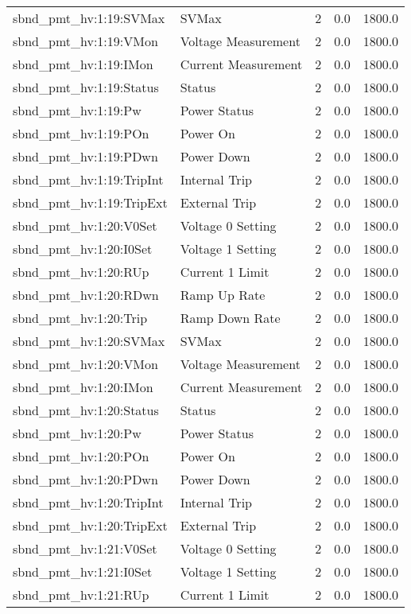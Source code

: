 \begin{center}
\begin{longtable}{l | l l l l }
sbnd\_pmt\_hv:1:19:SVMax & SVMax & 2 & 0.0 & 1800.0\\ 
sbnd\_pmt\_hv:1:19:VMon & Voltage Measurement & 2 & 0.0 & 1800.0\\ 
sbnd\_pmt\_hv:1:19:IMon & Current Measurement & 2 & 0.0 & 1800.0\\ 
sbnd\_pmt\_hv:1:19:Status & Status & 2 & 0.0 & 1800.0\\ 
sbnd\_pmt\_hv:1:19:Pw & Power Status & 2 & 0.0 & 1800.0\\ 
sbnd\_pmt\_hv:1:19:POn & Power On & 2 & 0.0 & 1800.0\\ 
sbnd\_pmt\_hv:1:19:PDwn & Power Down & 2 & 0.0 & 1800.0\\ 
sbnd\_pmt\_hv:1:19:TripInt & Internal Trip & 2 & 0.0 & 1800.0\\ 
sbnd\_pmt\_hv:1:19:TripExt & External Trip & 2 & 0.0 & 1800.0\\ 
sbnd\_pmt\_hv:1:20:V0Set & Voltage 0 Setting & 2 & 0.0 & 1800.0\\ 
sbnd\_pmt\_hv:1:20:I0Set & Voltage 1 Setting & 2 & 0.0 & 1800.0\\ 
sbnd\_pmt\_hv:1:20:RUp & Current 1 Limit & 2 & 0.0 & 1800.0\\ 
sbnd\_pmt\_hv:1:20:RDwn & Ramp Up Rate & 2 & 0.0 & 1800.0\\ 
sbnd\_pmt\_hv:1:20:Trip & Ramp Down Rate & 2 & 0.0 & 1800.0\\ 
sbnd\_pmt\_hv:1:20:SVMax & SVMax & 2 & 0.0 & 1800.0\\ 
sbnd\_pmt\_hv:1:20:VMon & Voltage Measurement & 2 & 0.0 & 1800.0\\ 
sbnd\_pmt\_hv:1:20:IMon & Current Measurement & 2 & 0.0 & 1800.0\\ 
sbnd\_pmt\_hv:1:20:Status & Status & 2 & 0.0 & 1800.0\\ 
sbnd\_pmt\_hv:1:20:Pw & Power Status & 2 & 0.0 & 1800.0\\ 
sbnd\_pmt\_hv:1:20:POn & Power On & 2 & 0.0 & 1800.0\\ 
sbnd\_pmt\_hv:1:20:PDwn & Power Down & 2 & 0.0 & 1800.0\\ 
sbnd\_pmt\_hv:1:20:TripInt & Internal Trip & 2 & 0.0 & 1800.0\\ 
sbnd\_pmt\_hv:1:20:TripExt & External Trip & 2 & 0.0 & 1800.0\\ 
sbnd\_pmt\_hv:1:21:V0Set & Voltage 0 Setting & 2 & 0.0 & 1800.0\\ 
sbnd\_pmt\_hv:1:21:I0Set & Voltage 1 Setting & 2 & 0.0 & 1800.0\\ 
sbnd\_pmt\_hv:1:21:RUp & Current 1 Limit & 2 & 0.0 & 1800.0\\ 

\end{longtable}
\end{center}
